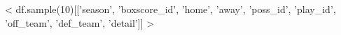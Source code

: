 



<%
df.sample(10)[['season', 'boxscore_id', 'home', 'away', 'poss_id', 'play_id',
'off_team', 'def_team', 'detail']]
 >




